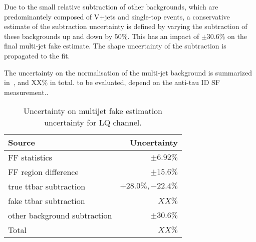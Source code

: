 
Due to the small relative subtraction of other backgrounds, which are predominantely composed of V+jets and single-top events,
a conservative estimate of the subtraction uncertainty is defined by varying the subtraction of these backgrounds up and down by $50\%$. 
This has an impact of $\pm 30.6 \%$ on the final multi-jet fake estimate. The shape uncertainty of the subtraction is propagated to the fit.

The uncertainty on the normalisation of the multi-jet background is summarized in~, and XX\% in total.
{\color{red} to be evaluated, depend on the anti-tau ID SF measurement.}.

\begin{table}[htbp]
  \centering
  \begin{tabular}{lr}
    \toprule
    Source & Uncertainty \\
    \midrule
    FF statistics & $\pm 6.92\%$ \\[0.3em]
    FF region difference & $\pm 15.6 \%$ \\[0.3em]
    true ttbar subtraction & $+28.0\%, -22.4\%$ \\[0.3em]
    fake ttbar subtraction & $XX\%$ \\[0.3em]
    other background subtraction & $\pm 30.6\%$ \\[0.3em]
    \midrule
    Total & $XX\%$ \\
    \bottomrule
  \end{tabular}
  \caption{Uncertainty on multijet fake estimation uncertainty for LQ \hadhad channel.}
  \label{tab:LQ_systematics_multijet_uncertainty}
\end{table}

